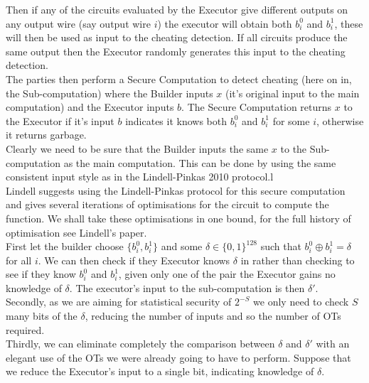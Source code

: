 \documentclass[ %
                    author={Nicholas Tutte},
                supervisor={Prof. Nigel Smart},
                    degree={MEng},
                     title={Secure Two Party Computation},
                  subtitle={A practical comparison of recent protocols},
                      type={Research - GG1K},
                      year={2015} ]{dissertation}
\begin{document}
					Then if any of the circuits evaluated by the Executor give different outputs on any output wire (say output wire $i$) the executor will obtain both $b_i^0$ and $b_i^1$, these will then be used as input to the cheating detection. If all circuits produce the same output then the Executor randomly generates this input to the cheating detection.\\
					
					The parties then perform a Secure Computation to detect cheating (here on in, the Sub-computation) where the Builder inputs $x$ (it's original input to the main computation) and the Executor inputs $b$. The Secure Computation returns $x$ to the Executor if it's input $b$ indicates it knows both $b_i^0$ and $b_i^1$ for some $i$, otherwise it returns garbage.\\

					Clearly we need to be sure that the Builder inputs the same $x$ to the Sub-computation as the main computation. This can be done by using the same consistent input style as in the Lindell-Pinkas 2010 protocol.l\\

					Lindell suggests using the Lindell-Pinkas protocol for this secure computation and gives several iterations of optimisations for the circuit to compute the function. We shall take these optimisations in one bound, for the full history of optimisation see Lindell's paper.\\

					First let the builder choose $\{b_i^0, b_i^1\}$ and some $\delta \in \{0, 1\}^{128}$ such that $b_i^0 \oplus b_i^1 = \delta$ for all $i$. We can then check if they Executor knows $\delta$ in rather than checking to see if they know $b_i^0$ and $b_i^1$, given only one of the pair the Executor gains no knowledge of $\delta$. The executor's input to the sub-computation is then $\delta'$.\\

					Secondly, as we are aiming for statistical security of $2^{-S}$ we only need to check $S$ many bits of the $\delta$, reducing the number of inputs and so the number of OTs required.\\

					Thirdly, we can eliminate completely the comparison between $\delta$ and $\delta'$ with an elegant use of the OTs we were already going to have to perform. Suppose that we reduce the Executor's input to a single bit, indicating knowledge of $\delta$.\\
\end{document}
